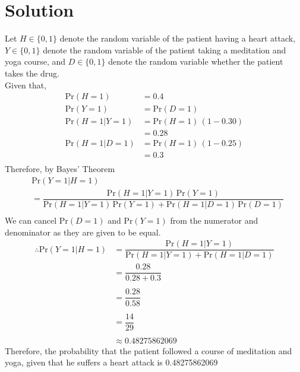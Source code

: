 \documentclass[journal,12pt,twocolumn]{IEEEtran}
\begin{document}
\section*{Solution}
Let $H \in \{ 0, 1\}$ denote the random variable of the patient having a heart attack, $Y \in \{ 0, 1\} $ denote the random variable of the patient taking a meditation and yoga course, and $D \in \{ 0, 1\} $ denote the random variable whether the patient takes the drug.\\
Given that,
\begin{align*}
\text{Pr}(H=1) &= 0.4 \\
\text{Pr}(Y=1) &= \text{Pr}(D=1)\\
\text{Pr}(H=1|Y=1) &= \text{Pr}(H=1)\,(1-0.30)\\
&= 0.28 \\
\text{Pr}(H=1|D=1) &= \text{Pr}(H=1)\,(1-0.25)\\
&= 0.3\\
\end{align*}
Therefore, by Bayes' Theorem
\begin{align*}
&\text{Pr}(Y=1|H=1) \\
&= \dfrac{\text{Pr}(H=1|Y=1)\,\text{Pr}(Y=1)}{\text{Pr}(H=1|Y=1)\,\text{Pr}(Y=1) + \text{Pr}(H=1|D=1)\,\text{Pr}(D=1)} \\
\end{align*}
We can cancel $\text{Pr}(D=1)$ and $\text{Pr}(Y=1)$ from the numerator and denominator as they are given to be equal.\\
\begin{align*}
\therefore \text{Pr}(Y=1|H=1) &= \dfrac{\text{Pr}(H=1|Y=1)}{\text{Pr}(H=1|Y=1) + \text{Pr}(H=1|D=1)} \\
&= \dfrac{0.28}{0.28 + 0.3} \\ ~\\[-1em]
&= \dfrac{0.28}{0.58} \\ ~\\[-1em]
&= \dfrac{14}{29} \\ ~\\[-1em]
&\approx 0.48275862069
\end{align*}
Therefore, the probability that the patient followed a course of meditation and yoga, given that he suffers a heart attack is 0.48275862069
\end{document}
